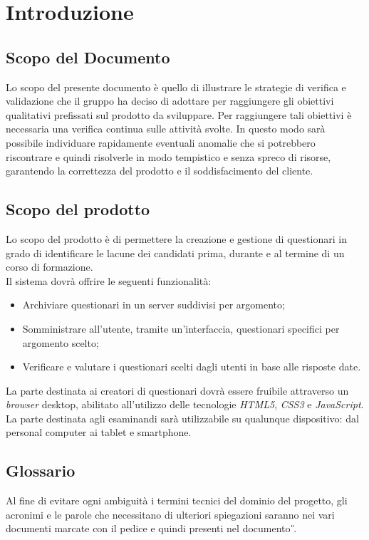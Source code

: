 \section{Introduzione}
\subsection{Scopo del Documento}
Lo scopo del presente documento è quello di illustrare le strategie di verifica e validazione che il gruppo \gruppo \hspace{1mm} ha deciso di adottare per raggiungere gli obiettivi qualitativi prefissati sul prodotto da sviluppare. Per raggiungere tali obiettivi è necessaria una verifica continua sulle attività svolte. In questo modo sarà possibile individuare rapidamente eventuali anomalie che si potrebbero riscontrare e quindi risolverle in modo tempistico e senza spreco di risorse, garantendo la correttezza del prodotto e il soddisfacimento del cliente.

\subsection{Scopo del prodotto}
Lo scopo del prodotto è di permettere la creazione e gestione di questionari in grado di identificare le lacune dei candidati prima, durante e al termine di un corso di formazione. 
\\Il sistema dovrà offrire le seguenti funzionalità:
\begin{itemize}
	\item
	Archiviare questionari in un server suddivisi per argomento;
	\item
	Somministrare all'utente, tramite un'interfaccia, questionari specifici per argomento scelto;
	\item
	Verificare e valutare i questionari scelti dagli utenti in base alle risposte date.
\end{itemize}
La parte destinata ai creatori di questionari dovrà essere fruibile attraverso un \textit{browser} desktop, abilitato all'utilizzo delle tecnologie \textit{HTML5}, \textit{CSS3} e \textit{JavaScript}. La parte destinata agli esaminandi sarà utilizzabile su qualunque dispositivo: dal personal computer ai tablet e smartphone.

\subsection{Glossario}
Al fine di evitare ogni ambiguità i termini tecnici del dominio del progetto, gli acronimi e le parole che necessitano di ulteriori spiegazioni saranno nei vari documenti marcate con il pedice  e quindi presenti nel documento \textit{\G}.
